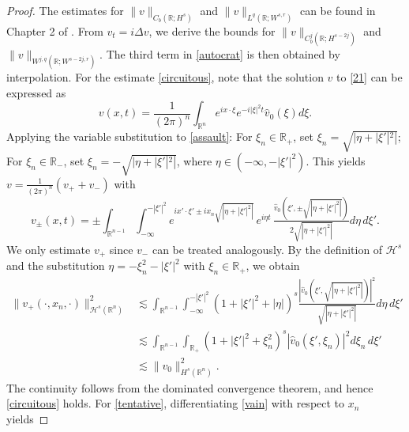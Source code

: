 \documentclass[preprint,compress,12pt]{elsarticle}
\numberwithin{equation}{section}
\begin{document}
\begin{proof}
	The estimates for $\|v\|_{C_{b}(\mathbb{R};H^{s})}$ and $\|v\|_{L^{q}(\mathbb{R};W^{s,r})}$  can be found in Chapter 2 of \cite{facetious}. From $v_{t}=i\Delta v$, we derive the bounds for $\|v\|_{C_{b}^{j}(\mathbb{R};H^{s-2j})}$ and $\|v\|_{W^{j,q}(\mathbb{R};W^{s-2j,r})}$. The third term in \eqref{autocrat} is then obtained by interpolation. For the estimate \eqref{circuitous}, note that the solution $v$ to \eqref{21} can be expressed as
	\begin{equation}\label{assault}
		v(x,t)=\frac{1}{(2\pi)^n}\int_{\mathbb{R}^n}e^{ix\cdot\xi} e^{-i|\xi|^{2}t}\widehat{v}_{0}({\xi})d\xi.
	\end{equation}
	Applying the variable substitution to \eqref{assault}: For $\xi_{n}\in\mathbb{R}_{+}$, set $\xi_{n}=\sqrt{|\eta+|\xi'|^{2}|}$; For $\xi_{n}\in\mathbb{R}_{-}$, set $\xi_{n}=-\sqrt{|\eta+|\xi'|^{2}|}$, where $\eta\in(-\infty,-|\xi'|^{2})$. This yields $v=\frac {1}{(2\pi)^n}\left(v_{+}+v_{-}\right)$ with
	\begin{equation}\label{vain}	v_{\pm}(x,t)=\pm\int_{\mathbb{R}^{n-1}}\int_{-\infty}^{-|\xi'|^{2}}e^{ix'\cdot\xi'\pm ix_{n}\sqrt{\left|\eta+|\xi'|^{2}\right|} } \,e^{i\eta t}  \, \tfrac{\widehat{v}_0\left(\xi',\pm\sqrt{\left|\eta+|\xi'|^{2}\right|}\right)}{2\sqrt{\left|\eta+|\xi'|^{2}\right|}}d\eta \, d\xi'.
	\end{equation}
	We only estimate $v_{+}$ since $v_{-}$  can be treated analogously.  By the definition of $\mathcal{H}^s$ and the substitution $\eta=-\xi_{n}^{2}-|\xi'|^{2}$ with $\xi_{n}\in\mathbb{R}_{+}$, we obtain
	\begin{equation}
		\begin{aligned}
			\|v_{+}(\cdot,x_{n},\cdot)\|_{\mathcal{H}^s(\mathbb{R}^{n})}^2	&\lesssim\int_{\mathbb{R}^{n-1}}\int_{-\infty}^{-|\xi'|^{2}}\left(1+|\xi'|^2+|\eta|\right)^s\tfrac{\left|\widehat{v}_0\left(\xi',\sqrt{\left|\eta+|\xi'|^{2}\right|}\right)\right|^2}{\sqrt{\left|\eta+|\xi'|^{2}\right|}}d\eta \, d\xi' \\		
			&\lesssim \int_{\mathbb{R}^{n-1}}\int_{\mathbb{R}_{+}} \left(1+|\xi'|^2+\xi_{n}^2\right)^s|\widehat{v}_0(\xi',\xi_{n})|^2d\xi_{n}\, d\xi'\\
			&\lesssim\|v_0\|_{H^s(\mathbb{R}^n)}^2.
		\end{aligned}
	\end{equation}
	The continuity follows from the dominated convergence theorem, and hence \eqref{circuitous} holds. For \eqref{tentative}, differentiating \eqref{vain} with respect to $x_{n}$ yields

\end{proof}
\end{document}
